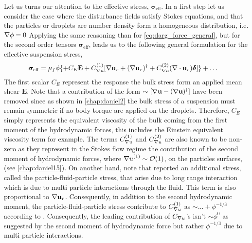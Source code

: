 Let us turns our attention to the effective stress, $\bm\sigma_\text{eff}$. 
In a first step let us consider the case where the disturbance fields satisfy Stokes equations, and that the particles or droplets are 
number density form a homogeneous distribution, i.e. $\mathbf{\nabla} \phi = 0$ 
Applying the same reasoning than for \ref{eq:darg_force_general}, but for the second order tensors  $\bm\sigma_\text{eff}$, leads us to the following general formulation for the effective suspension stress,  
\begin{align}
    \bm\sigma_\text{eff} &= 
    \mu_f \phi 
    \{ 
    + C_E  \textbf{E}
    +  C_{\grad u}^{(1)} [\grad \textbf{u}_{r} +(\grad \textbf{u}_{r})^\dagger + C_{\grad u}^{(2)}(\div  \textbf{u}_{r})\bm\delta] \}
    + \ldots
    \label{eq:stress_stokes}
\end{align}
The first scalar $C_E$ represent the response the bulk stress form an applied mean shear $\textbf{E}$. 
Note that a contribution of the form $\sim[\mathbf{\nabla} \textbf{u}-(\mathbf{\nabla} \textbf{u})^\dagger]$ have been removed since as shown in \ref{chap:daniel2} the bulk stress of a suspension must remain symmetric if no body-torque are applied on the droplets. 
Therefore, $C_E$ simply represents the equivalent viscosity of the bulk coming from the first moment of the hydrodynamic forces, this includes the Einstein equivalent viscosity term for example. 
The terms $C_{\mathbf{\nabla} u}^{(1)}$ and $C_{\mathbf{\nabla} u}^{(2)}$ are also known to be non-zero as they represent in the Stokes flow regime the contribution of the second moment of hydrodynamic forces, where ${\mathbf{\nabla} u}^{(1)}\sim \mathcal{O}(1)$, on the particles surfaces, (see \ref{chap:daniel15}). 
On another hand, note that \citet{zhang2021stress} reported an additional stress, called the particle-fluid-particle stress, that arise due to long range interaction which is due to multi particle interactions through the fluid. 
This term is also proportional to $\mathbf{\nabla} \textbf{u}_{r}$. 
Consequently, in addition to the second hydrodynamic moment, the particle-fluid-particle stress contribute to $C_{\mathbf{\nabla} u}^{(1)}$ as $\sim \ldots+ \phi^{-1/3}$ according to \citep{zhang2021stress}. 
Consequently, the leading contribution of $C_{\mathbf{\nabla} u}$'s isn't $\sim \phi^0$ as suggested by the second moment of hydrodynamic force but rather $\phi^{-1/3}$ due to multi particle interactions. 


